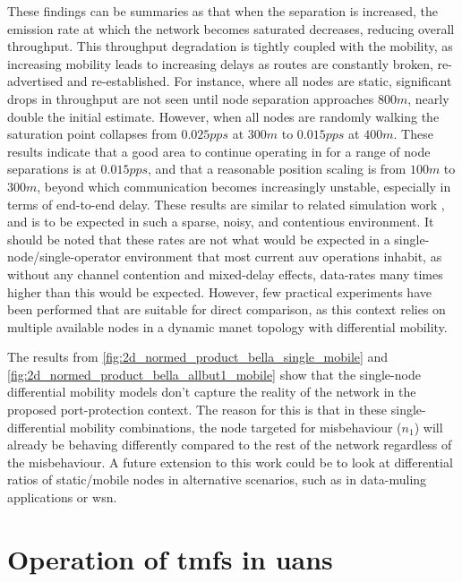 These findings can be summaries as that when the separation is increased, the emission rate at which the network becomes saturated decreases, reducing overall throughput. 
This throughput degradation is tightly coupled with the mobility, as increasing mobility leads to increasing delays as routes are constantly broken, re-advertised and re-established. 
For instance, where all nodes are static, significant drops in throughput are not seen until node separation approaches $800m$, nearly double the initial estimate. 
However, when all nodes are randomly walking the saturation point collapses from $0.025pps$ at $300m$ to $0.015pps$ at $400m$.
These results indicate that a good area to continue operating in for a range of node separations is at $0.015pps$, and that a reasonable position scaling is from $100m$ to $300m$, beyond which communication becomes increasingly unstable, especially in terms of end-to-end delay.
These results are similar to related simulation work \cite{Miquel2008,Diamant2010,Noh2012}, and is to be expected in such a sparse, noisy, and contentious environment.
It should be noted that these rates are not what would be expected in a single-node/single-operator environment that most current \gls{auv} operations inhabit, as without any channel contention and mixed-delay effects, data-rates many times higher than this would be expected.
However, few practical experiments have been performed that are suitable for direct comparison, as this context relies on multiple available nodes in a dynamic \gls{manet} topology with differential mobility.


The results from \autoref{fig:2d_normed_product_bella_single_mobile} and \autoref{fig:2d_normed_product_bella_allbut1_mobile} show that the single-node differential mobility models don't capture the reality of the network in the proposed port-protection context.
The reason for this is that in these single-differential mobility combinations, the node targeted for misbehaviour ($n_1$) will already be behaving differently compared to the rest of the network regardless of the misbehaviour.
A future extension to this work could be to look at differential ratios of static/mobile nodes in alternative scenarios, such as in data-muling applications or \gls{wsn}.

\section{Operation of \glspl{tmf} in \glspl{uan}}

